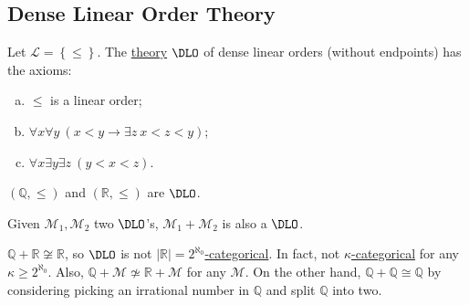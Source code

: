 \subsection{Dense Linear Order Theory}
\begin{definition}[\(\DLO\)]\label{def:DLO}
	Let \(\mathcal{L} = \left\{ \leq \right\} \). The \hyperref[def:theory]{theory} \(\DLO\) of dense linear orders (without endpoints) has the axioms:
	\begin{enumerate}[(a)]
		\item \(\leq \) is a linear order;
		\item \(\forall x \forall y\ (x < y \to \exists z\ x < z < y)\);
		\item \(\forall x \exists y \exists z\ (y < x < z)\).
	\end{enumerate}
\end{definition}

\begin{eg}
	\((\mathbb{Q} , \leq )\) and \((\mathbb{R} , \leq )\) are \(\DLO\).
\end{eg}

\begin{eg}
	Given \(\mathcal{M} _1, \mathcal{M} _2\) two \(\DLO\)'s, \(\mathcal{M} _1 + \mathcal{M} _2\) is also a \(\DLO\).
\end{eg}

\begin{eg}
	\(\mathbb{Q} + \mathbb{R} \not \cong \mathbb{R} \), so \(\DLO\) is not \hyperref[def:categorical]{\(\vert \mathbb{R} \vert = 2^{\aleph_0}\)-categorical}. In fact, not \hyperref[def:categorical]{\(\kappa \)-categorical} for any \(\kappa \geq 2^{\aleph_0}\). Also, \(\mathbb{Q} + \mathcal{M} \not \simeq \mathbb{R} + \mathcal{M} \) for any \(\mathcal{M} \). On the other hand, \(\mathbb{Q} + \mathbb{Q} \cong \mathbb{Q} \) by considering picking an irrational number in \(\mathbb{Q} \) and split \(\mathbb{Q} \) into two.
\end{eg}

